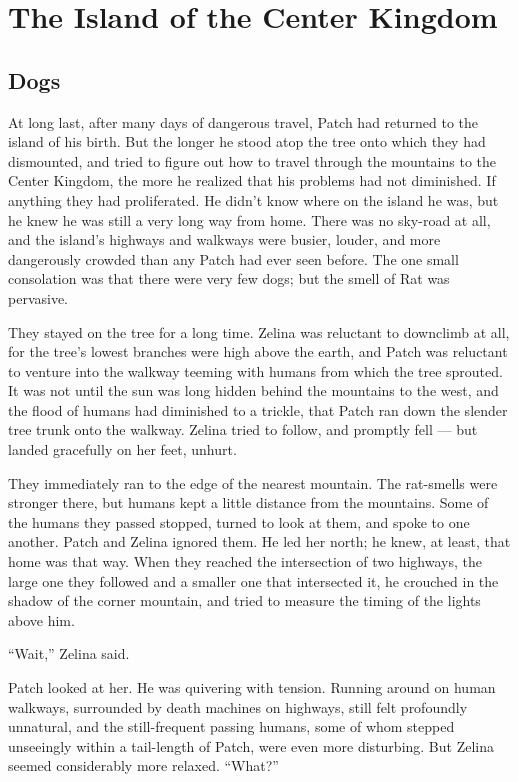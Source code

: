 \documentclass[12pt]{memoir}
\begin{document}

\chapter{The Island of the Center Kingdom}

\section{Dogs}

At long last, after many days of dangerous travel, Patch had returned
to the island of his birth. But the longer he stood atop the tree onto
which they had dismounted, and tried to figure out how to travel
through the mountains to the Center Kingdom, the more he realized that
his problems had not diminished. If anything they had proliferated. He
didn’t know where on the island he was, but he knew he was still a
very long way from home. There was no sky-road at all, and the
island’s highways and walkways were busier, louder, and more
dangerously crowded than any Patch had ever seen before. The one small
consolation was that there were very few dogs; but the smell of Rat
was pervasive.

They stayed on the tree for a long time. Zelina was reluctant to
downclimb at all, for the tree’s lowest branches were high above the
earth, and Patch was reluctant to venture into the walkway teeming
with humans from which the tree sprouted. It was not until the sun was
long hidden behind the mountains to the west, and the flood of humans
had diminished to a trickle, that Patch ran down the slender tree
trunk onto the walkway. Zelina tried to follow, and promptly fell —
but landed gracefully on her feet, unhurt.

They immediately ran to the edge of the nearest mountain. The
rat-smells were stronger there, but humans kept a little distance from
the mountains. Some of the humans they passed stopped, turned to look
at them, and spoke to one another. Patch and Zelina ignored them. He
led her north; he knew, at least, that home was that way. When they
reached the intersection of two highways, the large one they followed
and a smaller one that intersected it, he crouched in the shadow of
the corner mountain, and tried to measure the timing of the lights
above him.

“Wait,” Zelina said.

Patch looked at her. He was quivering with tension. Running around on
human walkways, surrounded by death machines on highways, still felt
profoundly unnatural, and the still-frequent passing humans, some of
whom stepped unseeingly within a tail-length of Patch, were even more
disturbing. But Zelina seemed considerably more relaxed. “What?”
\end{document}

